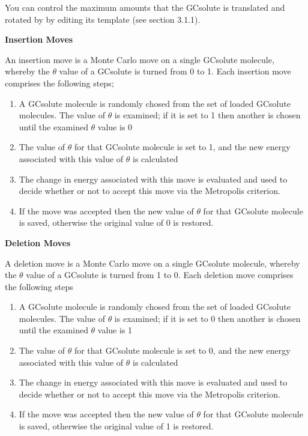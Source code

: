 \documentclass[letterpaper,10pt,english]{sphinxmanual}
\begin{document}
You can control the maximum amounts that the GCsolute is translated and rotated by by editing its template (see section 3.1.1).

\textbf{Insertion Moves}

An insertion move is a Monte Carlo move on a single GCsolute molecule, whereby the \(\theta\) value of a GCsolute is turned from 0 to 1. Each insertion move comprises the following steps;
\begin{enumerate}
\item {} 
A GCsolute molecule is randomly chosed from the set of loaded GCsolute molecules. The value of \(\theta\) is examined; if it is set to 1 then another is chosen until the examined \(\theta\) value is 0

\item {} 
The value of \(\theta\) for that GCsolute molecule is set to 1, and the new energy associated with this value of \(\theta\) is calculated

\item {} 
The change in energy associated with this move is evaluated and used to decide whether or not to accept this move via the Metropolis criterion.

\item {} 
If the move was accepted then the new value of \(\theta\) for that GCsolute molecule is saved, otherwise the original value of 0 is restored.

\end{enumerate}

\textbf{Deletion Moves}

A deletion move is a Monte Carlo move on a single GCsolute molecule, whereby the \(\theta\) value of a GCsolute is turned from 1 to 0. Each deletion move comprises the following steps
\begin{enumerate}
\item {} 
A GCsolute molecule is randomly chosed from the set of loaded GCsolute molecules. The value of \(\theta\) is examined; if it is set to 0 then another is chosen until the examined \(\theta\) value is 1

\item {} 
The value of \(\theta\) for that GCsolute molecule is set to 0, and the new energy associated with this value of \(\theta\) is calculated

\item {} 
The change in energy associated with this move is evaluated and used to decide whether or not to accept this move via the Metropolis criterion.

\item {} 
If the move was accepted then the new value of \(\theta\) for that GCsolute molecule is saved, otherwise the original value of 1 is restored.

\end{enumerate}
\end{document}

